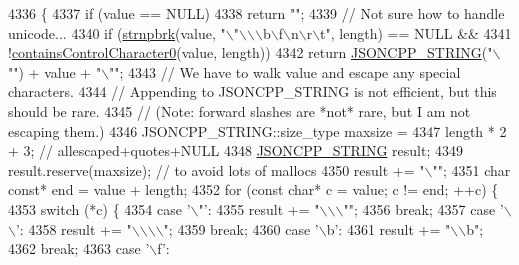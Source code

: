 \begin{DoxyCode}
4336                                                                                \{
4337   \textcolor{keywordflow}{if} (value == NULL)
4338     \textcolor{keywordflow}{return} \textcolor{stringliteral}{""};
4339   \textcolor{comment}{// Not sure how to handle unicode...}
4340   \textcolor{keywordflow}{if} (\hyperlink{namespace_json_a7492156d0c7d2dd2f672acacfb240320}{strnpbrk}(value, \textcolor{stringliteral}{"\(\backslash\)"\(\backslash\)\(\backslash\)\(\backslash\)b\(\backslash\)f\(\backslash\)n\(\backslash\)r\(\backslash\)t"}, length) == NULL &&
4341       !\hyperlink{namespace_json_ae8a357381f264cf28f46449e79ab1dea}{containsControlCharacter0}(value, length))
4342     \textcolor{keywordflow}{return} \hyperlink{json-forwards_8h_a1e723f95759de062585bc4a8fd3fa4be}{JSONCPP\_STRING}(\textcolor{stringliteral}{"\(\backslash\)""}) + value + \textcolor{stringliteral}{"\(\backslash\)""};
4343   \textcolor{comment}{// We have to walk value and escape any special characters.}
4344   \textcolor{comment}{// Appending to JSONCPP\_STRING is not efficient, but this should be rare.}
4345   \textcolor{comment}{// (Note: forward slashes are *not* rare, but I am not escaping them.)}
4346   JSONCPP\_STRING::size\_type maxsize =
4347       length * 2 + 3; \textcolor{comment}{// allescaped+quotes+NULL}
4348   \hyperlink{json-forwards_8h_a1e723f95759de062585bc4a8fd3fa4be}{JSONCPP\_STRING} result;
4349   result.reserve(maxsize); \textcolor{comment}{// to avoid lots of mallocs}
4350   result += \textcolor{stringliteral}{"\(\backslash\)""};
4351   \textcolor{keywordtype}{char} \textcolor{keyword}{const}* end = value + length;
4352   \textcolor{keywordflow}{for} (\textcolor{keyword}{const} \textcolor{keywordtype}{char}* c = value; c != end; ++c) \{
4353     \textcolor{keywordflow}{switch} (*c) \{
4354     \textcolor{keywordflow}{case} \textcolor{charliteral}{'\(\backslash\)"'}:
4355       result += \textcolor{stringliteral}{"\(\backslash\)\(\backslash\)\(\backslash\)""};
4356       \textcolor{keywordflow}{break};
4357     \textcolor{keywordflow}{case} \textcolor{charliteral}{'\(\backslash\)\(\backslash\)'}:
4358       result += \textcolor{stringliteral}{"\(\backslash\)\(\backslash\)\(\backslash\)\(\backslash\)"};
4359       \textcolor{keywordflow}{break};
4360     \textcolor{keywordflow}{case} \textcolor{charliteral}{'\(\backslash\)b'}:
4361       result += \textcolor{stringliteral}{"\(\backslash\)\(\backslash\)b"};
4362       \textcolor{keywordflow}{break};
4363     \textcolor{keywordflow}{case} \textcolor{charliteral}{'\(\backslash\)f'}:

\end{DoxyCode}
